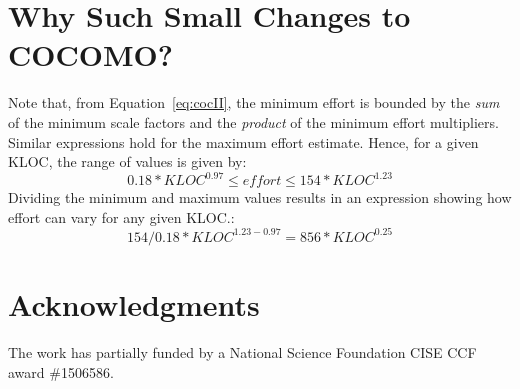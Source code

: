 \documentclass[final,twocolumn,5p]{elsarticle}
\newcommand{\eq}[1]{Equation~\ref{eq:#1}}
\theoremstyle{break}
\begin{document}
\section{Why Such Small Changes to COCOMO?}

  
Note that, from \eq{cocII},
the minimum  
effort  is bounded by the  {\em sum} of the minimum scale factors
and the {\em product} of the minimum effort multipliers.
Similar expressions hold for the  maximum effort estimate. Hence,
for a given KLOC, the range of values is given by:
\[
0.18*\mathit{KLOC}^{0.97}  \le \mathit{effort} \le 154*\mathit{KLOC}^{1.23}\]
Dividing the minimum and maximum values results in an  expression showing
how    effort can vary for any given KLOC.: 
\begin{equation}\label{eq:ration}
154/0.18 *\mathit{KLOC}^{1.23 - 0.97} = 856*\mathit{KLOC}^{0.25}
\end{equation}


\section*{Acknowledgments}
The work has partially funded by a National Science Foundation CISE CCF award \#1506586.
 
\vspace*{0.5mm}
 
 
% 

  

   



 
    
\end{document}
